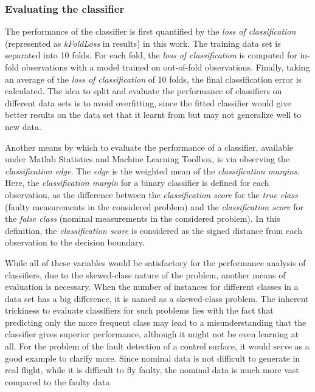 \subsubsection{Evaluating the classifier}
\label{evalClassifier}

The performance of the classifier is first quantified by the \emph{loss of classification} (represented as \emph{kFoldLoss} in results) in this work. 
The training data set is separated into 10 folds. For each fold, the \emph{loss of classification} is computed for in-fold observations with a model trained on out-of-fold observations. 
Finally, taking an average of the \emph{loss of classification} of 10 folds, the final classification error is calculated.
The idea to split and evaluate the performance of classifiers on different data sets is to avoid overfitting, since the fitted classifier would give better results on the data set that it learnt from but may not generalize well to new data. 

Another means by which to evaluate the performance of a classifier, available under Matlab Statistics and Machine Learning Toolbox, is via observing the \emph{classification edge}. 
The \emph{edge} is the weighted mean of the \emph{classification margins}. 
Here, the \emph{classification margin} for a binary classifier is defined for each observation, as the difference between the \emph{classification score} for the \emph{true class} (faulty measurements in the considered problem) and the \emph{classification score} for the \emph{false class} (nominal measurements in the considered problem). 
In this definition, the \emph{classification score} is considered as the signed distance from each observation to the decision boundary.

While all of these variables would be satisfactory for the performance analysis of classifiers, due to the skewed-class nature of the problem, another means of evaluation is necessary.
When the number of instances for different classes in a data set has a big difference, it is named as a skewed-class problem. 
The inherent trickiness to evaluate classifiers for such problems lies with the fact that predicting only the more frequent class may lead to a misunderstanding that the classifier gives superior performance, although it might not be even learning at all. 
For the problem of the fault detection of a control surface, it would serve as a good example to clarify more. 
Since nominal data is not difficult to generate in real flight, while it is difficult to fly faulty, the nominal data is much more vast compared to the faulty data 

